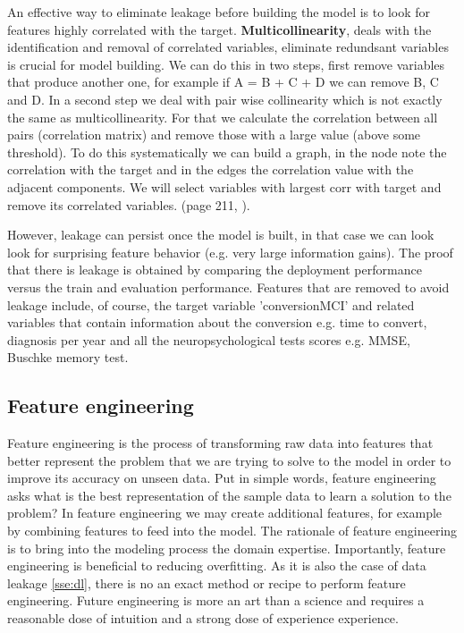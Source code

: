 \documentclass[11pt]{article}
\begin{document}

An effective way to eliminate leakage before building the model is to look for features highly correlated with the target.
\textbf{Multicollinearity}, deals with the identification and removal of correlated variables, eliminate redundsant variables is crucial for model building. We can do this in two steps, first remove variables that produce another one, for example if A = B + C + D we can remove B, C and D. 
In a second step we deal with pair wise collinearity which is not exactly  the same as multicollinearity. For that we calculate the correlation between all pairs (correlation matrix) and remove those with a large value (above some threshold). To do this systematically we can build a graph, in the node note the correlation with the target and in the edges the correlation value with the adjacent components. We will select variables with largest corr with target and remove its correlated variables. (page 211, \cite{wu2012foundations}).

However, leakage can persist once the model is built, in that case we can look look for surprising feature behavior (e.g. very large information gains). The proof that there is leakage is obtained by comparing the deployment performance versus the train and evaluation performance. 
Features that are removed to avoid leakage include, of course, the target variable 'conversionMCI' and related variables that contain information about the conversion e.g. time to convert, diagnosis per year and all the neuropsychological tests scores e.g. MMSE, Buschke memory test.

\subsection{Feature engineering}
\label{sse:fe}
Feature engineering is the process of transforming raw data into features that better represent the problem that we are trying to solve to the model in order to improve its accuracy on unseen data. 
Put in simple words, feature engineering asks what is the best representation of the sample data to learn a solution to the problem?
In feature engineering we may create additional features, for example by combining features to feed into the model. The rationale of feature engineering is to bring into the modeling process the domain expertise. Importantly, feature engineering is beneficial to reducing overfitting. As it is also the case of data leakage \ref{sse:dl}, there is no an exact method or recipe to perform feature engineering. Future engineering is more an art than a science and requires a reasonable dose of intuition and a strong dose of experience experience.
\end{document}
